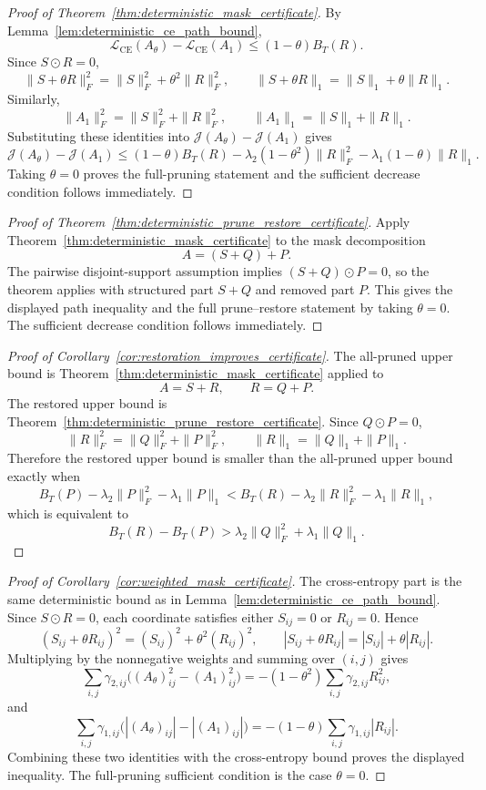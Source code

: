 \documentclass[11pt]{article}
\theoremstyle{plain}
\theoremstyle{definition}
\theoremstyle{remark}
\newcommand{\1}{\mathbf{1}}
\begin{document}
\begin{proof}[Proof of Theorem~\ref{thm:deterministic_mask_certificate}]
By Lemma~\ref{lem:deterministic_ce_path_bound},
\[
\mathcal L_{\mathrm{CE}}(A_\theta)-\mathcal L_{\mathrm{CE}}(A_1)
\le
(1-\theta)B_T(R).
\]
Since \(S\odot R=0\),
\[
\|S+\theta R\|_F^2=\|S\|_F^2+\theta^2\|R\|_F^2,
\qquad
\|S+\theta R\|_1=\|S\|_1+\theta\|R\|_1.
\]
Similarly,
\[
\|A_1\|_F^2=\|S\|_F^2+\|R\|_F^2,
\qquad
\|A_1\|_1=\|S\|_1+\|R\|_1.
\]
Substituting these identities into \(\mathcal J(A_\theta)-\mathcal J(A_1)\) gives
\[
\mathcal J(A_\theta)-\mathcal J(A_1)
\le
(1-\theta)B_T(R)
-\lambda_2(1-\theta^2)\|R\|_F^2
-\lambda_1(1-\theta)\|R\|_1.
\]
Taking \(\theta=0\) proves the full-pruning statement and the sufficient decrease condition follows immediately.
\end{proof}

\begin{proof}[Proof of Theorem~\ref{thm:deterministic_prune_restore_certificate}]
Apply Theorem~\ref{thm:deterministic_mask_certificate} to the mask decomposition
\[
A=(S+Q)+P.
\]
The pairwise disjoint-support assumption implies \((S+Q)\odot P=0\), so the theorem applies with structured part \(S+Q\) and removed part \(P\). This gives the displayed path inequality and the full prune--restore statement by taking \(\theta=0\). The sufficient decrease condition follows immediately.
\end{proof}

\begin{proof}[Proof of Corollary~\ref{cor:restoration_improves_certificate}]
The all-pruned upper bound is Theorem~\ref{thm:deterministic_mask_certificate} applied to
\[
A=S+R,
\qquad R=Q+P.
\]
The restored upper bound is Theorem~\ref{thm:deterministic_prune_restore_certificate}. Since \(Q\odot P=0\),
\[
\|R\|_F^2=\|Q\|_F^2+\|P\|_F^2,
\qquad
\|R\|_1=\|Q\|_1+\|P\|_1.
\]
Therefore the restored upper bound is smaller than the all-pruned upper bound exactly when
\[
B_T(P)-\lambda_2\|P\|_F^2-\lambda_1\|P\|_1
<
B_T(R)-\lambda_2\|R\|_F^2-\lambda_1\|R\|_1,
\]
which is equivalent to
\[
B_T(R)-B_T(P)
>
\lambda_2\|Q\|_F^2+\lambda_1\|Q\|_1.
\]
\end{proof}

\begin{proof}[Proof of Corollary~\ref{cor:weighted_mask_certificate}]
The cross-entropy part is the same deterministic bound as in Lemma~\ref{lem:deterministic_ce_path_bound}. Since \(S\odot R=0\), each coordinate satisfies either \(S_{ij}=0\) or \(R_{ij}=0\). Hence
\[
(S_{ij}+\theta R_{ij})^2=(S_{ij})^2+\theta^2(R_{ij})^2,
\qquad
|S_{ij}+\theta R_{ij}|=|S_{ij}|+\theta|R_{ij}|.
\]
Multiplying by the nonnegative weights and summing over \((i,j)\) gives
\[
\sum_{i,j}\gamma_{2,ij}\big((A_\theta)_{ij}^2-(A_1)_{ij}^2\big)
=
-(1-\theta^2)\sum_{i,j}\gamma_{2,ij}R_{ij}^2,
\]
and
\[
\sum_{i,j}\gamma_{1,ij}\big(|(A_\theta)_{ij}|-| (A_1)_{ij}|\big)
=
-(1-\theta)\sum_{i,j}\gamma_{1,ij}|R_{ij}|.
\]
Combining these two identities with the cross-entropy bound proves the displayed inequality. The full-pruning sufficient condition is the case \(\theta=0\).
\end{proof}
\end{document}
